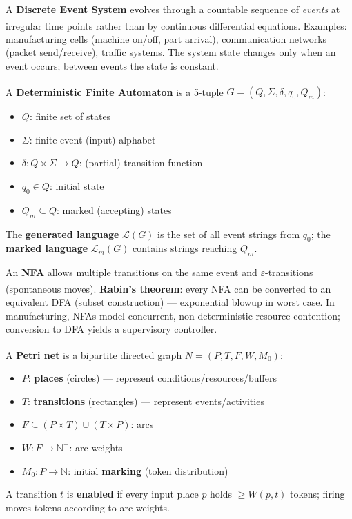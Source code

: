 \begin{tcbitemize}[ skin=sectionraster ]
    \tcbitem[title={Discrete Event Systems (DES)}, raster multicolumn=3]
    A \textbf{Discrete Event System} evolves through a countable sequence of \emph{events} at irregular time points rather than by continuous differential equations\textsuperscript{\cite[][pp.~1--20]{cassandrasIntroductionDiscreteEvent2009}}.
    Examples: manufacturing cells (machine on/off, part arrival), communication networks (packet send/receive), traffic systems.
    The system state changes only when an event occurs; between events the state is constant.

    \tcbitem[title={Finite Automata (DFA)}, raster multicolumn=3]
    A \textbf{Deterministic Finite Automaton} is a 5-tuple $G = (Q, \Sigma, \delta, q_0, Q_m)$\textsuperscript{\cite[][pp.~23--35]{linzIntroductionFormalLanguages2006}}:
    \begin{itemize}
        \item $Q$: finite set of states
        \item $\Sigma$: finite event (input) alphabet
        \item $\delta: Q \times \Sigma \to Q$: (partial) transition function
        \item $q_0 \in Q$: initial state
        \item $Q_m \subseteq Q$: marked (accepting) states
    \end{itemize}
    The \textbf{generated language} $\mathcal{L}(G)$ is the set of all event strings from $q_0$; the \textbf{marked language} $\mathcal{L}_m(G)$ contains strings reaching $Q_m$.

    \tcbitem[title={Non-deterministic Automata and Equivalence}, raster multicolumn=3]
    An \textbf{NFA} allows multiple transitions on the same event and $\varepsilon$-transitions (spontaneous moves)\textsuperscript{\cite[][pp.~50--70]{linzIntroductionFormalLanguages2006}}.
    \textbf{Rabin's theorem}: every NFA can be converted to an equivalent DFA (subset construction) — exponential blowup in worst case.
    In manufacturing, NFAs model concurrent, non-deterministic resource contention; conversion to DFA yields a supervisory controller.

    \tcbitem[title={Petri Nets}, raster multicolumn=3]
    A \textbf{Petri net} is a bipartite directed graph $N = (P, T, F, W, M_0)$\textsuperscript{\cite[][pp.~1--30]{reisigUnderstandingPetriNets2013}}:
    \begin{itemize}
        \item $P$: \textbf{places} (circles) — represent conditions/resources/buffers
        \item $T$: \textbf{transitions} (rectangles) — represent events/activities
        \item $F \subseteq (P \times T) \cup (T \times P)$: arcs
        \item $W: F \to \mathbb{N}^+$: arc weights
        \item $M_0: P \to \mathbb{N}$: initial \textbf{marking} (token distribution)
    \end{itemize}
    A transition $t$ is \textbf{enabled} if every input place $p$ holds $\geq W(p,t)$ tokens; firing moves tokens according to arc weights.


\end{tcbitemize}
